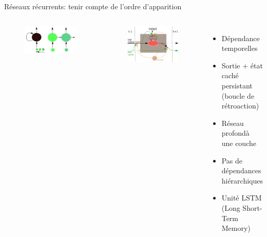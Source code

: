 \documentclass{beamer}
\begin{document}
\begin{frame}{Réseaux récurrents: tenir compte de l'ordre d'apparition}
  \begin{columns}
    {
      \begin{figure}
        \centering
        \includegraphics[scale=0.15]{../Figures/Recurrent}
      \end{figure}
    }
    {
      \begin{figure}
        \centering
        \includegraphics[scale=0.15]{../Figures/LSTM}
      \end{figure}
    }

    \begin{itemize}
    \item Dépendance temporelles
    \item Sortie + état caché persistant (boucle de rétroaction)
    \item Réseau \og profond\fg à une couche
    \item Pas de dépendances hiérarchiques\pause
    \item Unité LSTM (Long Short-Term Memory)
    \end{itemize}
  \end{columns}
\end{frame}
\end{document}
